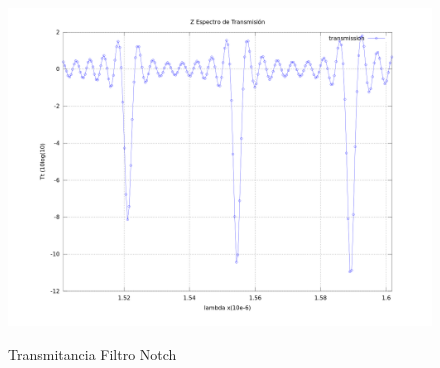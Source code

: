 \begin{figure}[h!]
\caption{Transmitancia Filtro Notch}
\centering
\includegraphics[width=1.0\textwidth,natwidth=1200,natheight=900]{figs/gausrc_flux_mod-graph_res80.png}
\label{fig:meep_res_n}
\end{figure}

